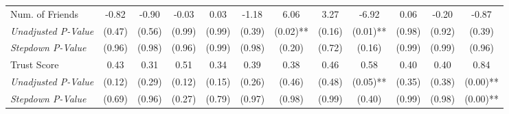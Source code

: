 \begin{tabular}{l c c c c c c c c c c c}
Num. of Friends & -0.82 & -0.90 & -0.03 & 0.03 & -1.18 & 6.06 & 3.27 & -6.92 & 0.06 & -0.20 & -0.87 \\
\quad \textit{Unadjusted P-Value} & (0.47) & (0.56) & (0.99) & (0.99) & (0.39) & (0.02)** & (0.16) & (0.01)** & (0.98) & (0.92) & (0.39) \\
\quad \textit{Stepdown P-Value} & (0.96) & (0.98) & (0.96) & (0.99) & (0.98) & (0.20) & (0.72) & (0.16) & (0.99) & (0.99) & (0.96) \\
Trust Score & 0.43 & 0.31 & 0.51 & 0.34 & 0.39 & 0.38 & 0.46 & 0.58 & 0.40 & 0.40 & 0.84 \\
\quad \textit{Unadjusted P-Value} & (0.12) & (0.29) & (0.12) & (0.15) & (0.26) & (0.46) & (0.48) & (0.05)** & (0.35) & (0.38) & (0.00)** \\
\quad \textit{Stepdown P-Value} & (0.69) & (0.96) & (0.27) & (0.79) & (0.97) & (0.98) & (0.99) & (0.40) & (0.99) & (0.98) & (0.00)** \\
\bottomrule
\end{tabular}
